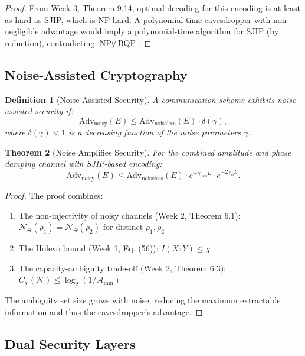 \documentclass[12pt]{article}
\newtheorem{theorem}{Theorem}[section]
\newtheorem{definition}[theorem]{Definition}
\newcommand{\calN}{\mathcal{N}}
\begin{document}
\begin{proof}
From Week 3, Theorem 9.14, optimal decoding for this encoding is at least as hard as SJIP, which is NP-hard. A polynomial-time eavesdropper with non-negligible advantage would imply a polynomial-time algorithm for SJIP (by reduction), contradicting \(\text{NP} \nsubseteq \text{BQP}\).
\end{proof}

\subsection{Noise-Assisted Cryptography}

\begin{definition}[Noise-Assisted Security]
A communication scheme exhibits noise-assisted security if:
\begin{equation}
    \text{Adv}_{\text{noisy}}(E) \leq \text{Adv}_{\text{noiseless}}(E) \cdot \delta(\gamma),
\end{equation}
where \(\delta(\gamma) < 1\) is a decreasing function of the noise parameters \(\gamma\).
\end{definition}

\begin{theorem}[Noise Amplifies Security]
For the combined amplitude and phase damping channel with SJIP-based encoding:
\begin{equation}
    \text{Adv}_{\text{noisy}}(E) \leq \text{Adv}_{\text{noiseless}}(E) \cdot e^{-\gamma_{\text{loss}}L} \cdot e^{-2\gamma_\phi L}.
\end{equation}
\end{theorem}

\begin{proof}
The proof combines:
\begin{enumerate}
    \item The non-injectivity of noisy channels (Week 2, Theorem 6.1): \(\calN_\Theta(\rho_1) = \calN_\Theta(\rho_2)\) for distinct \(\rho_1,\rho_2\)
    \item The Holevo bound (Week 1, Eq. (56)): \(I(X:Y) \leq \chi\)
    \item The capacity-ambiguity trade-off (Week 2, Theorem 6.3): \(C_\chi(\calN) \leq \log_2(1/\mathcal{A}_{\min})\)
\end{enumerate}
The ambiguity set size grows with noise, reducing the maximum extractable information and thus the eavesdropper's advantage.
\end{proof}

\subsection{Dual Security Layers}
\end{document}
